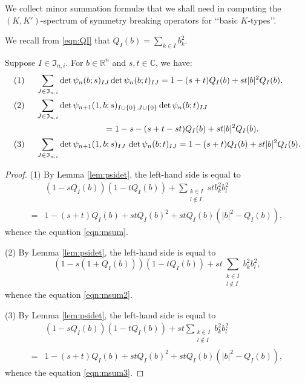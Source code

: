 We collect minor summation formul{\ae} 
 that we shall need
 in computing the $(K,K')$-spectrum of symmetry breaking operators
 for \lq\lq{basic $K$-types}\rq\rq.  



We recall from \eqref{eqn:QI}
 that $Q_I(b)=\sum_{k \in I} b_k^2$.  
\begin{lemma}
\label{lem:msum}
Suppose $I \in {\mathfrak{I}}_{n,i}$.  
For $b \in {\mathbb{R}}^n$ and $s,t \in {\mathbb{C}}$, 
 we have:
\begin{alignat}{2}
\label{eqn:msum}
&{\text{\rm{(1)}}}\,\,
&&\sum_{J \in {\mathfrak{I}}_{n,i}}
\det \psi_n(b;s)_{I J}
\det \psi_n(b;t)_{I J}
=
1-(s+t)Q_I(b) + s t |b|^2 Q_I(b).  
\\
&{\text{\rm{(2)}}}
&&\sum_{J \in {\mathfrak{I}}_{n,i}}
\det \psi_{n+1}(1,b;s)_{I\cup \{0\},  J\cup \{0\}}
\det \psi_n(b;t)_{I J}
\notag
\\
&
&&\qquad\qquad\qquad\qquad
=
1- s -(s+t-st)Q_I(b) + s t |b|^2 Q_I(b).  
\label{eqn:msum2}
\\
\label{eqn:msum3}
&{\text{\rm{(3)}}}
&&
\sum_{J \in {\mathfrak{I}}_{n,i}}
  \det \psi_{n+1}(1,b;s)_{I J}
\,
  \det \psi_n(b;t)_{I J}
  =
   1-(s+t) Q_I(b) + s t |b|^2 Q_I(b).  
\end{alignat}
\end{lemma}
\begin{proof}
(1)\enspace
By Lemma \ref{lem:psidet}, 
the left-hand side is equal
 to 
\begin{align*}
&(1-s Q_I(b))(1-t Q_I(b))
+\sum_{\substack{k \in I\\ l \notin I}} s t b_k^2 b_l^2
\\
=&
1-(s+t)Q_I(b) + s t Q_I(b)^2 + st Q_I(b)(|b|^2-Q_I(b)), 
\end{align*}
whence the equation \eqref{eqn:msum}.  
\par\noindent
(2)\enspace
By Lemma \ref{lem:psidet}, 
the left-hand side is equal
 to 
\[
(1-s (1+Q_I(b)))(1-t Q_I(b))
+s t \sum_{\substack{k \in I\\ l \notin I}} b_k^2 b_l^2, 
\]
whence the equation \eqref{eqn:msum2}.  
\par\noindent
(3)\enspace
By Lemma \ref{lem:psidet}, 
 the left-hand side is equal to 
\begin{align*}
   &(1-s Q_I(b))(1-t Q_I(b))
   + s t \sum_{\substack{k \in I\\ l \notin I}} b_k^2 b_l^2
\\
   =&
   1-(s+t) Q_I(b) + s t Q_I(b)^2 + s t Q_I(b) (|b|^2-Q_I(b)), 
\end{align*}
whence the equation \eqref{eqn:msum3}.  
\end{proof}



